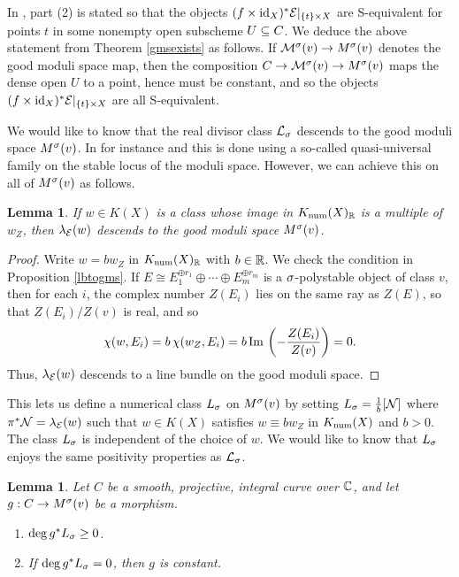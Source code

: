 \documentclass[letterpaper,11pt]{amsart}%
\newtheorem{lem}[thm]{Lemma}
\theoremstyle{remark}
\begin{document}
In \cite{BM}, part (2) is stated so that the objects $(f \times \mathrm{id}_X)^*\mathcal{E}|_{\{t\} \times X}$ are S-equivalent for points $t$ in some nonempty open subscheme $U \subseteq C$. We deduce the above statement from Theorem \ref{gmsexists} as follows. If $\mathcal{M}^\sigma(v) \to M^\sigma(v)$ denotes the good moduli space map, then the composition $C \to \mathcal{M}^\sigma(v) \to M^\sigma(v)$ maps the dense open $U$ to a point, hence must be constant, and so the objects $(f\times \mathrm{id}_X)^*\mathcal{E}|_{\{t\} \times X}$ are all S-equivalent. 

We would like to know that the real divisor class $\mathcal{L}_\sigma$ descends to the good moduli space $M^\sigma(v)$. In for instance \cite{BM} and \cite{nuer} this is done using a so-called quasi-universal family on the stable locus of the moduli space. However, we can achieve this on all of $M^\sigma(v)$ as follows.
\begin{lem}\label{nefdescendtogms}
    If $w \in K(X)$ is a class whose image in $K_{\mathrm{num}}(X)_{\mathbb{R}}$ is a multiple of $w_Z$, then $\lambda_{\mathcal{E}}(w)$ descends to the good moduli space $M^\sigma(v)$.
\end{lem} 
\begin{proof}
    Write $w = b w_Z$ in $K_{\mathrm{num}}(X)_{\mathbb{R}}$ with $b \in \mathbb{R}$. We check the condition in Proposition \ref{lbtogms}. If $E \cong E_1^{\oplus r_1} \oplus \cdots \oplus E_m^{\oplus r_m}$ is a $\sigma$-polystable object of class $v$, then for each $i$, the complex number $Z(E_i)$ lies on the same ray as $Z(E)$, so that $Z(E_i)/Z(v)$ is real, and so
    \[ \chi(w, E_i) = b\,\chi(w_Z, E_i) = b\,\mathrm{Im}\,\left(-\frac{Z(E_i)}{Z(v)}\right) = 0. \]
    Thus, $\lambda_{\mathcal{E}}(w)$ descends to a line bundle on the good moduli space.    
\end{proof}
This lets us define a numerical class $L_\sigma$ on $M^\sigma(v)$ by setting $L_\sigma = \frac{1}{b}[\mathcal{N}]$ where $\pi^*\mathcal{N} = \lambda_{\mathcal{E}}(w)$ such that $w \in K(X)$ satisfies $w \equiv b w_Z$ in $K_{\mathrm{num}}(X)$ and $b > 0$. The class $L_\sigma$ is independent of the choice of $w$. We would like to know that $L_\sigma$ enjoys the same positivity properties as $\mathcal{L}_\sigma$.
\begin{lem}\label{gmsnef}
    Let $C$ be a smooth, projective, integral curve over $\mathbb{C}$, and let $g: C \to M^\sigma(v)$ be a morphism.
    \begin{enumerate}[(1')]
        \item $\deg g^* L_\sigma \ge 0$.
        \item If $\deg g^* L_\sigma = 0$, then $g$ is constant.
    \end{enumerate}
\end{lem}
\end{document}
